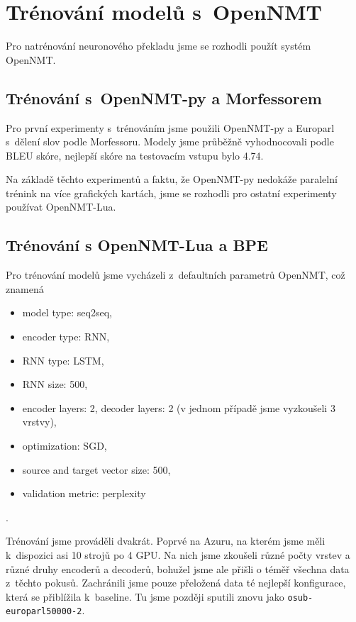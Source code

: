 \documentclass[a4]{article}
\begin{document}
\section{Trénování modelů s~OpenNMT}

Pro natrénování neuronového překladu jsme se rozhodli použít systém
OpenNMT\cite{opennmt}. 
%
%
%
%
%
%
%
%



\subsection{Trénování s~OpenNMT-py a Morfessorem}

Pro první experimenty s~trénováním jsme použili OpenNMT-py a Europarl s~dělení slov
podle Morfessoru. Modely jsme průběžně vyhodnocovali podle
BLEU skóre, nejlepší skóre na testovacím vstupu bylo 4.74.

Na základě těchto experimentů a faktu, že OpenNMT-py nedokáže paralelní
trénink na více grafických kartách, jsme se rozhodli pro ostatní
experimenty používat OpenNMT-Lua.

\subsection{Trénování s OpenNMT-Lua a BPE}

Pro trénování modelů jsme vycházeli z~defaultních parametrů OpenNMT, což znamená
\begin{itemize}
\item model type: seq2seq, 
\item encoder type: RNN, 
\item RNN type: LSTM, 
\item RNN size: 500, 
\item encoder layers: 2, decoder layers: 2 (v jednom případě jsme vyzkoušeli 3 vrstvy),
\item optimization: SGD, 
\item source and target vector size: 500, 
\item validation metric: perplexity
\end{itemize}.


Trénování jsme prováděli dvakrát. Poprvé na Azuru, na kterém jsme měli
k~dispozici asi 10 strojů po 4 GPU. Na nich jsme zkoušeli různé počty vrstev
a různé druhy encoderů a decoderů, bohužel jsme ale přišli o téměř všechna data
z~těchto pokusů. Zachránili jsme pouze přeložená data té nejlepší konfigurace, která
se přiblížila k~baseline. Tu jsme později sputili znovu jako
\texttt{osub-europarl50000-2}.
\end{document}
